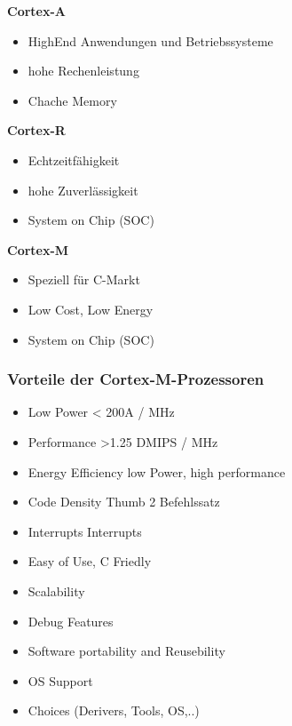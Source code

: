 \begin{multicols}{3}
    \textbf{Cortex-A}
    \begin{itemize}
        \item HighEnd Anwendungen und Betriebssysteme
        \item hohe Rechenleistung
        \item Chache Memory
    \end{itemize}
    
    \textbf{Cortex-R}
    \begin{itemize}
        \item Echtzeitfähigkeit
        \item hohe Zuverlässigkeit
        \item System on Chip (SOC) 
    \end{itemize}  
    
    \textbf{Cortex-M}
    \begin{itemize}
        \item Speziell für \mu C-Markt
        \item Low Cost, Low Energy
        \item System on Chip (SOC) 
    \end{itemize}             
\end{multicols}

\subsubsection{Vorteile der Cortex-M-Prozessoren}
\begin{multicols}{2}
    \begin{itemize}
        \item Low Power
        \subitem < 200\mu A / MHz
        \item Performance
        \subitem >1.25 DMIPS / MHz
        \item Energy Efficiency
        \subitem low Power, high performance
        \item Code Density
        \subitem Thumb 2 Befehlssatz
        \item Interrupts
         Interrupts
        \item Easy of Use, C Friedly
        \item Scalability
        \item Debug Features
        \item Software portability and Reusebility
        \item OS Support
        \item Choices (Derivers, Tools, OS,..)    
    \end{itemize}
\end{multicols}
\clearpage 

